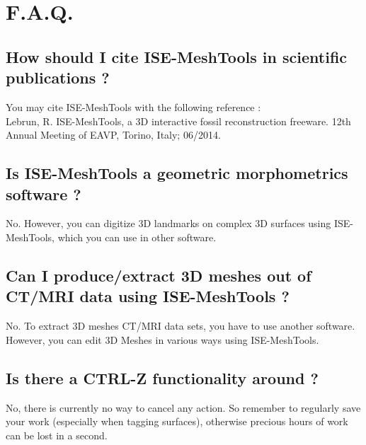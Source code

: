 
 \chapter{F.A.Q.}
		\minitoc  
    \section{How should I cite ISE-MeshTools in scientific publications ?}
    You may  cite ISE-MeshTools with the following reference :\\
		Lebrun, R. ISE-MeshTools, a 3D interactive fossil reconstruction freeware. 
		12th Annual Meeting of EAVP, Torino, Italy; 06/2014.
    \section{Is ISE-MeshTools a geometric morphometrics software ?}
    No. However, you can digitize 3D landmarks on complex 3D surfaces using ISE-MeshTools, which you 
		can use in other software.
		\section{Can I produce/extract 3D meshes out of CT/MRI data using ISE-MeshTools ?}
		No. To extract 3D meshes CT/MRI data sets, you have to use another software. However, you can edit 
		3D Meshes in various ways using ISE-MeshTools.
		\section{Is there a CTRL-Z functionality around ?}
		No, there is currently no way to cancel any action. So remember to regularly save your work (especially when tagging surfaces), otherwise precious hours of work can be lost in a second.
